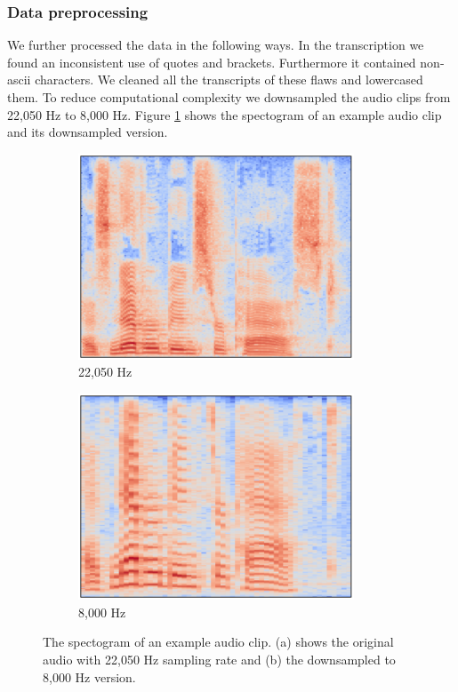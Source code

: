 \documentclass[11pt]{article}
\begin{document}
\subsubsection*{Data preprocessing}

We further processed the data in the following ways. In the transcription we found an inconsistent use of quotes and brackets. Furthermore it contained non-ascii characters. We cleaned all the transcripts of these flaws and lowercased them. To reduce computational complexity we downsampled the audio clips from 22,050 Hz to 8,000 Hz. Figure \ref{fig:downsampled} shows the spectogram of an example audio clip and its downsampled version.
\begin{figure}
  \begin{subfigure}{0.5\textwidth}
    \centering
        \includegraphics[width=0.9\textwidth]{image/original.pdf}
    \caption{22,050 Hz}
  \end{subfigure}%
  \begin{subfigure}{0.5\textwidth}
    \centering
    \includegraphics[width=0.9\textwidth]{image/downsampled.pdf}
    \caption{8,000 Hz}
  \end{subfigure}
  \caption{The spectogram of an example audio clip. (a) shows the original audio with 22,050 Hz sampling rate and (b) the downsampled to 8,000 Hz version.}{\label{fig:downsampled}}
\end{figure}
\end{document}
